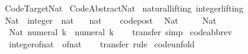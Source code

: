 %
\begin{isabellebody}%
\def\isabellecontext{Code{\isacharunderscore}Target{\isacharunderscore}Nat}%
%
\isamarkuptrue%
%
\isadelimtheory
%
\endisadelimtheory
%
\isatagtheory
{}\isamarkupfalse%
\ Code{\isacharunderscore}Target{\isacharunderscore}Nat\isanewline
{}\ Code{\isacharunderscore}Abstract{\isacharunderscore}Nat\isanewline
{}%
\endisatagtheory
{\isafoldtheory}%
%
\isadelimtheory
%
\endisadelimtheory
%
\isamarkuptrue%
\isamarkupfalse%
\isanewline
{}\ natural{\isachardot}lifting\ integer{\isachardot}lifting\isanewline
{}\isanewline
\isanewline
{}\isamarkupfalse%
\ Nat\ {\isacharcolon}{\isacharcolon}\ {\isachardoublequoteopen}integer\ {\isasymRightarrow}\ nat{\isachardoublequoteclose}\isanewline
\ \ \ nat\isanewline
%
\isadelimproof
\ \ %
\endisadelimproof
%
\isatagproof
\isacommand{{\isachardot}}\isamarkupfalse%
%
\endisatagproof
{\isafoldproof}%
%
\isadelimproof
\isanewline
%
\endisadelimproof
\isanewline
{}\isamarkupfalse%
\ {\isacharbrackleft}code{\isacharunderscore}post{\isacharbrackright}{\isacharcolon}\isanewline
\ \ {\isachardoublequoteopen}Nat\ {}\ {\isacharequal}\ {}{\isachardoublequoteclose}\isanewline
\ \ {\isachardoublequoteopen}Nat\ {}\ {\isacharequal}\ {}{\isachardoublequoteclose}\isanewline
\ \ {\isachardoublequoteopen}Nat\ {\isacharparenleft}numeral\ k{\isacharparenright}\ {\isacharequal}\ numeral\ k{\isachardoublequoteclose}\isanewline
%
\isadelimproof
\ \ %
\endisadelimproof
%
\isatagproof
{}\isamarkupfalse%
\ {\isacharparenleft}transfer{\isacharcomma}\ simp{\isacharparenright}{\isacharplus}%
\endisatagproof
{\isafoldproof}%
%
\isadelimproof
\isanewline
%
\endisadelimproof
\isanewline
{}\isamarkupfalse%
\ {\isacharbrackleft}code{\isacharunderscore}abbrev{\isacharbrackright}{\isacharcolon}\isanewline
\ \ {\isachardoublequoteopen}integer{\isacharunderscore}of{\isacharunderscore}nat\ {\isacharequal}\ of{\isacharunderscore}nat{\isachardoublequoteclose}\isanewline
%
\isadelimproof
\ \ %
\endisadelimproof
%
\isatagproof
{}\isamarkupfalse%
\ transfer\ rule%
\endisatagproof
{\isafoldproof}%
%
\isadelimproof
\isanewline
%
\endisadelimproof
\isanewline
{}\isamarkupfalse%
\ {\isacharbrackleft}code{\isacharunderscore}unfold{\isacharbrackright}{\isacharcolon}\isanewline

\end{isabellebody}
